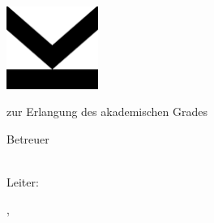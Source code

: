 
\begin{titlepage}

{\sffamily

\begin{center}

\includegraphics[width=30mm]{figures/JKU_Logo}

\vfill\vfill\vfill
\vfill\vfill\vfill

\myauthorwithexistingtitles

\vfill\vfill\vfill

{\LARGE\bfseries\mytitle}


\vfill\vfill\vfill
\vfill\vfill\vfill


{\bfseries\large\myworktitle}

zur Erlangung des akademischen Grades

\mygrade

\mydegreeprogramme


\vfill\vfill\vfill


\vfill

{\bfseries\large\myuniversity}


\vfill\vfill\vfill


Betreuer

\mysupervisor

\vfill

\myinstitute\\
Leiter: \myinstitutehead\\

\vfill



\vfill\vfill\vfill


\mysubmissiontown, \mysubmissionmonth~\mysubmissionyear

\end{center}
}%
\end{titlepage}

\newpage

